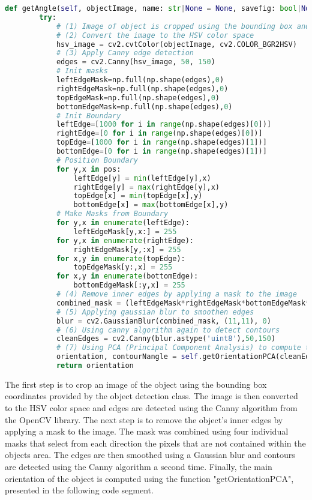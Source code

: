 \begin{lstlisting}[language=python]
def getAngle(self, objectImage, name: str|None = None, savefig: bool|None = None) -> float:
        try:
            # (1) Image of object is cropped using the bounding box and passed as a parameter
            # (2) Convert the image to the HSV color space
            hsv_image = cv2.cvtColor(objectImage, cv2.COLOR_BGR2HSV)
            # (3) Apply Canny edge detection
            edges = cv2.Canny(hsv_image, 50, 150)
            # Init masks
            leftEdgeMask=np.full(np.shape(edges),0)
            rightEdgeMask=np.full(np.shape(edges),0)
            topEdgeMask=np.full(np.shape(edges),0)
            bottomEdgeMask=np.full(np.shape(edges),0)
            # Init Boundary
            leftEdge=[1000 for i in range(np.shape(edges)[0])]
            rightEdge=[0 for i in range(np.shape(edges)[0])]
            topEdge=[1000 for i in range(np.shape(edges)[1])]
            bottomEdge=[0 for i in range(np.shape(edges)[1])]
            # Position Boundary
            for y,x in pos:
                leftEdge[y] = min(leftEdge[y],x)
                rightEdge[y] = max(rightEdge[y],x)
                topEdge[x] = min(topEdge[x],y)
                bottomEdge[x] = max(bottomEdge[x],y)
            # Make Masks from Boundary
            for y,x in enumerate(leftEdge):
                leftEdgeMask[y,x:] = 255
            for y,x in enumerate(rightEdge):
                rightEdgeMask[y,:x] = 255
            for x,y in enumerate(topEdge):
                topEdgeMask[y:,x] = 255
            for x,y in enumerate(bottomEdge):
                bottomEdgeMask[:y,x] = 255
            # (4) Remove inner edges by applying a mask to the image
            combined_mask = (leftEdgeMask*rightEdgeMask*bottomEdgeMask*topEdgeMask/255**3)
            # (5) Applying gaussian blur to smoothen edges
            blur = cv2.GaussianBlur(combined_mask, (11,11), 0)
            # (6) Using canny algorithm again to detect contours
            cleanEdges = cv2.Canny(blur.astype('uint8'),50,150)
            # (7) Using PCA (Principal Component Analysis) to compute the main orientation of the object
            orientation, contourNangle = self.getOrientationPCA(cleanEdges,objectImage)
            return orientation
\end{lstlisting}

The first step is to crop an image of the object using the bounding box coordinates provided by the object detection class. The image is then converted to the HSV color space and edges are detected using the Canny algorithm from the OpenCV library. The next step is to remove the object's inner edges by applying a mask to the image. The mask was combined using four individual masks that select from each direction the pixels that are not contained within the objects area. The edges are then smoothed using a Gaussian blur and contours are detected using the Canny algorithm a second time. Finally, the main orientation of the object is computed using the function "getOrientationPCA", presented in the following code segment.


